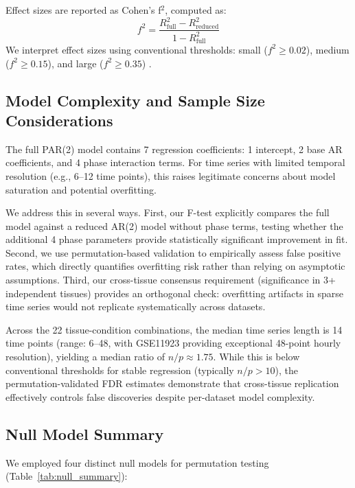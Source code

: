 \documentclass[11pt,a4paper]{article}
\begin{document}
Effect sizes are reported as Cohen's f$^2$, computed as:
\begin{equation}
f^2 = \frac{R^2_{\text{full}} - R^2_{\text{reduced}}}{1 - R^2_{\text{full}}}
\end{equation}
We interpret effect sizes using conventional thresholds: small ($f^2 \geq 0.02$), medium ($f^2 \geq 0.15$), and large ($f^2 \geq 0.35$) \citep{cohen1988statistical}.

\subsection{Model Complexity and Sample Size Considerations}

The full PAR(2) model contains 7 regression coefficients: 1 intercept, 2 base AR coefficients, and 4 phase interaction terms. For time series with limited temporal resolution (e.g., 6--12 time points), this raises legitimate concerns about model saturation and potential overfitting.

We address this in several ways. First, our F-test explicitly compares the full model against a reduced AR(2) model without phase terms, testing whether the additional 4 phase parameters provide statistically significant improvement in fit. Second, we use permutation-based validation to empirically assess false positive rates, which directly quantifies overfitting risk rather than relying on asymptotic assumptions. Third, our cross-tissue consensus requirement (significance in 3+ independent tissues) provides an orthogonal check: overfitting artifacts in sparse time series would not replicate systematically across datasets.

Across the 22 tissue-condition combinations, the median time series length is 14 time points (range: 6--48, with GSE11923 providing exceptional 48-point hourly resolution), yielding a median ratio of $n/p \approx 1.75$. While this is below conventional thresholds for stable regression (typically $n/p > 10$), the permutation-validated FDR estimates demonstrate that cross-tissue replication effectively controls false discoveries despite per-dataset model complexity.

\subsection{Null Model Summary}
\label{sec:null_models}

We employed four distinct null models for permutation testing (Table~\ref{tab:null_summary}):
\end{document}
